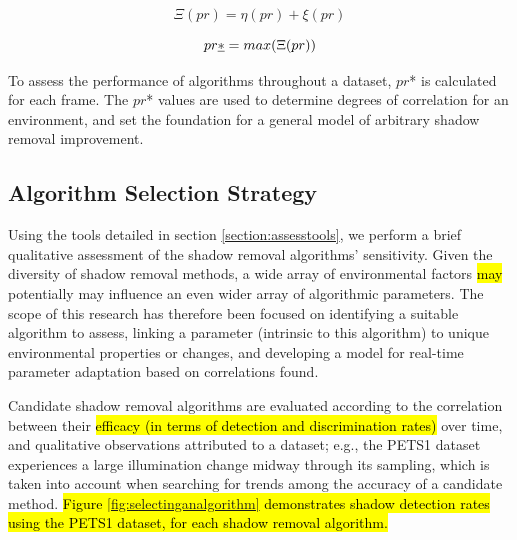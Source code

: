 \begin{equation}
\Xi(pr) = \eta(pr) + \xi(pr)
\label{eqn:score}
\end{equation}

\begin{equation}
pr\emph{*} = max(\Xi(pr))
\end{equation}

To assess the performance of algorithms throughout a dataset, $pr$* is calculated for each frame. The $pr$* values are used to determine degrees of correlation for an environment, and set the foundation for a general model of arbitrary shadow removal improvement.

\subsection{Algorithm Selection Strategy} \label{section:selectalgorithm}

Using the tools detailed in section \ref{section:assesstools}, we perform a brief qualitative assessment of the shadow removal algorithms' sensitivity. Given the diversity of shadow removal methods, a wide array of environmental factors \hl{may} potentially may influence an even wider array of algorithmic parameters. The scope of this research has therefore been focused on identifying a suitable algorithm to assess, linking a parameter (intrinsic to this algorithm) to unique environmental properties or changes, and developing a model for real-time parameter adaptation based on correlations found.


Candidate shadow removal algorithms are evaluated according to the correlation between their \hl{efficacy (in terms of detection and discrimination rates)} over time, and qualitative observations attributed to a dataset; e.g., the PETS1 dataset experiences a large illumination change midway through its sampling, which is taken into account when searching for trends among the accuracy of a candidate method. \hl{Figure \ref{fig:selectinganalgorithm} demonstrates shadow detection rates using the PETS1 dataset, for each shadow removal algorithm.}

